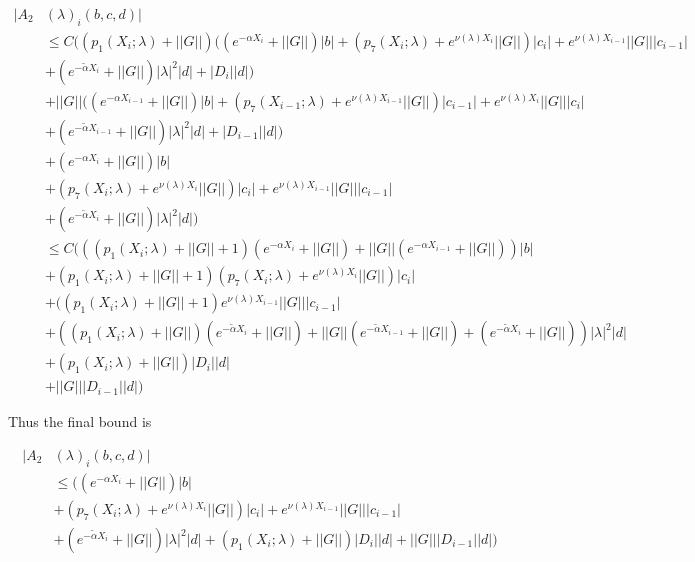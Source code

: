 \documentclass[12pt]{article}
\begin{document}
\begin{align*}
|A_2&(\lambda)_i(b, c, d)| \\
&\leq C \Big( (p_1(X_i; \lambda) + ||G||) ((e^{-\alpha X_i} + ||G||) |b| 
+ ( p_7(X_i; \lambda) + e^{\nu(\lambda)X_i} ||G||) |c_i| + e^{\nu(\lambda)X_{i-1}} ||G|| |c_{i-1}| \\
&+ (e^{-\tilde{\alpha} X_i} + ||G||) |\lambda|^2 |d| + |D_i||d| )\\
&+ ||G||((e^{-\alpha X_{i-1}} + ||G||) |b| 
+ ( p_7(X_{i-1}; \lambda) + e^{\nu(\lambda)X_{i-1}} ||G||) |c_{i-1}| + e^{\nu(\lambda)X_i} ||G|| |c_i| \\
&+ (e^{-\tilde{\alpha} X_{i-1}} + ||G||) |\lambda|^2 |d| + |D_{i-1}||d| ) \\
&+ (e^{-\alpha X_i} + ||G||) |b| \\
&+ ( p_7(X_i; \lambda) + e^{\nu(\lambda)X_i} ||G||) |c_i| + e^{\nu(\lambda)X_{i-1}} ||G|| |c_{i-1}| \\
&+ (e^{-\tilde{\alpha} X_i} + ||G||) |\lambda|^2 |d| \Big) \\
&\leq C \Big( ((p_1(X_i; \lambda) + ||G|| + 1) (e^{-\alpha X_i} + ||G||) +
||G||(e^{-\alpha X_{i-1}} + ||G||) ) |b| \\
&+ (p_1(X_i; \lambda) + ||G|| + 1)(p_7(X_i; \lambda) + e^{\nu(\lambda)X_i} ||G||) |c_i| \\
&+ ((p_1(X_i; \lambda) + ||G|| + 1)e^{\nu(\lambda)X_{i-1}} ||G|| |c_{i-1}| \\
&+ ((p_1(X_i; \lambda) + ||G||)(e^{-\tilde{\alpha} X_i} + ||G||) 
+ ||G||(e^{-\tilde{\alpha} X_{i-1}} + ||G||) + (e^{-\tilde{\alpha} X_i} + ||G||) )|\lambda|^2 |d| \\
&+ (p_1(X_i; \lambda) + ||G||) |D_i| |d| \\
&+ ||G|| |D_{i-1}| |d| \Big)
\end{align*} 

Thus the final bound is

\begin{align*}
|A_2&(\lambda)_i(b, c, d)| \\
&\leq \Big( (e^{-\alpha X_i} + ||G|| )|b| \\
&+ (p_7(X_i; \lambda) + e^{\nu(\lambda)X_i} ||G||) |c_i| + e^{\nu(\lambda)X_{i-1}} ||G|| |c_{i-1}| \\
&+ (e^{-\tilde{\alpha} X_i} + ||G||)|\lambda|^2 |d| 
+ (p_1(X_i; \lambda) + ||G||) |D_i| |d| 
+ ||G|| |D_{i-1}| |d| \Big)
\end{align*}
\end{document}
